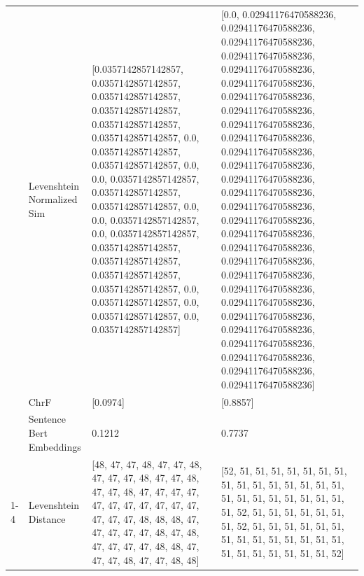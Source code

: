 \begin{tabular}{llll}
 & Levenshtein Normalized Sim & [0.0357142857142857, 0.0357142857142857, 0.0357142857142857, 0.0357142857142857, 0.0357142857142857, 0.0357142857142857, 0.0, 0.0357142857142857, 0.0357142857142857, 0.0, 0.0, 0.0357142857142857, 0.0357142857142857, 0.0357142857142857, 0.0, 0.0, 0.0357142857142857, 0.0, 0.0357142857142857, 0.0357142857142857, 0.0357142857142857, 0.0357142857142857, 0.0357142857142857, 0.0, 0.0357142857142857, 0.0, 0.0357142857142857, 0.0, 0.0357142857142857] & [0.0, 0.02941176470588236, 0.02941176470588236, 0.02941176470588236, 0.02941176470588236, 0.02941176470588236, 0.02941176470588236, 0.02941176470588236, 0.02941176470588236, 0.02941176470588236, 0.02941176470588236, 0.02941176470588236, 0.02941176470588236, 0.02941176470588236, 0.02941176470588236, 0.02941176470588236, 0.02941176470588236, 0.02941176470588236, 0.02941176470588236, 0.02941176470588236, 0.02941176470588236, 0.02941176470588236, 0.02941176470588236, 0.02941176470588236, 0.02941176470588236, 0.02941176470588236, 0.02941176470588236, 0.02941176470588236, 0.02941176470588236] \\
 & ChrF & [0.0974] & [0.8857] \\
 & Sentence Bert Embeddings & 0.1212 & 0.7737 \\
\cline{1-4}
\multirow[t]{4}{*}{Gutiri mundu wonaga wega wake, no kuonwo wonagwo} & Levenshtein Distance & [48, 47, 47, 48, 47, 47, 48, 47, 47, 47, 48, 47, 47, 48, 47, 47, 48, 47, 47, 47, 47, 47, 47, 47, 47, 47, 47, 47, 47, 47, 47, 48, 48, 48, 47, 47, 47, 47, 47, 48, 47, 48, 47, 47, 47, 47, 48, 48, 47, 47, 47, 48, 47, 47, 48, 48] & [52, 51, 51, 51, 51, 51, 51, 51, 51, 51, 51, 51, 51, 51, 51, 51, 51, 51, 51, 51, 51, 51, 51, 51, 51, 52, 51, 51, 51, 51, 51, 51, 51, 52, 51, 51, 51, 51, 51, 51, 51, 51, 51, 51, 51, 51, 51, 51, 51, 51, 51, 51, 51, 51, 51, 52] \\

\end{tabular}
